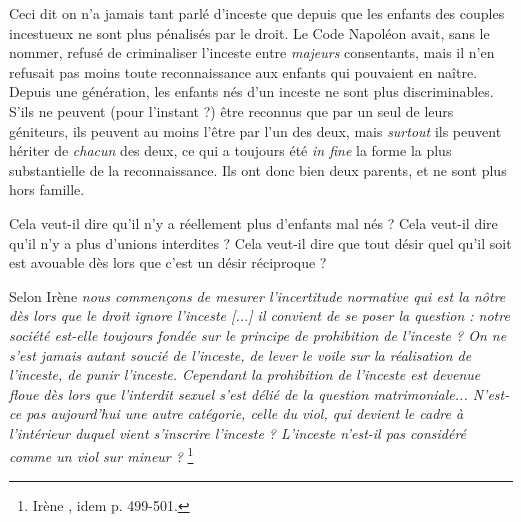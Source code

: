  Ceci dit on n'a jamais tant parlé d'inceste que depuis que les enfants des couples incestueux ne sont plus pénalisés par le droit. Le Code Napoléon avait, sans le nommer, refusé de criminaliser l'inceste entre \emph{majeurs} consentants, mais il n'en refusait pas moins toute reconnaissance aux enfants qui pouvaient en naître. Depuis une génération, les enfants nés d'un inceste ne sont plus discriminables. S'ils ne peuvent (pour l'instant ?) être reconnus que par un seul de leurs géniteurs, ils peuvent au moins l'être par l'un des deux, mais \emph{surtout} ils peuvent hériter %
 de \emph{chacun} des deux, ce qui a toujours été \emph{in fine} la forme la plus substantielle de la reconnaissance. Ils ont donc bien deux parents, et ne sont plus hors famille. 

 Cela veut-il dire qu'il n'y a réellement plus d'enfants mal nés ? Cela veut-il dire qu'il n'y a plus d'unions interdites ? Cela veut-il dire que tout désir quel qu'il soit est avouable dès lors que c'est un désir réciproque ? 

 Selon Irène  {\emph{nous commençons de mesurer l'incertitude normative qui est la nôtre dès lors que le droit ignore l'inceste \emph{[...]} il convient de se poser la question : notre société est-elle toujours fondée sur le principe de prohibition de l'inceste ? On ne s'est jamais autant soucié de l'inceste, de lever le voile sur la réalisation de l'inceste, de punir l'inceste. Cependant la prohibition de l'inceste est devenue floue dès lors que l'interdit sexuel s'est délié de la question matrimoniale... N'est-ce pas aujourd'hui une autre catégorie, celle du viol, qui devient le cadre à l'intérieur duquel vient s'inscrire l'inceste ? L'inceste n'est-il pas considéré comme un viol sur mineur ?}%
\footnote{Irène , idem p. 499-501.}%
}


